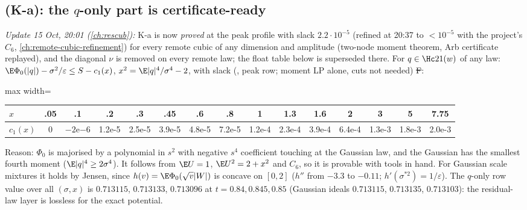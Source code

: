 \subsection{(K-a): the $q$-only part is certificate-ready}\label{sec:Ka}
\emph{Update 15 Oct, 20:01 (\autoref{ch:rescub}):} K-a is now \emph{proved} at the peak profile with slack $2.2\cdot10^{-5}$ (refined at 20:37 to $<10^{-5}$ with the project's $C_6$, \autoref{ch:remote-cubic-refinement}) for every remote cubic of any dimension and amplitude (two-node moment theorem, Arb certificate replayed), and the diagonal $\nu$ is removed on every remote law; the float table below is superseded there.
For $q\in\Hc21(w)$ of any law: $\E\Phi_0(|q|)-\sigma^2/\varepsilon\le S-c_1(x)$, $x^2=\E|q|^4/\sigma^4-2$, with slack (, peak row; moment LP alone,
cuts not needed) \st{F}:
\begin{center}\small
\begin{adjustbox}{max width=\linewidth}\begin{tabular}{lcccccccccccccc}\toprule
$x$ & .05 & .1 & .2 & .3 & .45 & .6 & .8 & 1 & 1.3 & 1.6 & 2 & 3 & 5 & 7.75\\\midrule
$c_1(x)$ & 0 & $-2$e$-6$ & 1.2e-5 & 2.5e-5 & 3.9e-5 & 4.8e-5 & 7.2e-5 & 1.2e-4 & 2.3e-4 & 3.9e-4 & 6.4e-4 & 1.3e-3 & 1.8e-3 & 2.0e-3\\\bottomrule
\end{tabular}\end{adjustbox}
\end{center}
Reason: $\Phi_0$ is majorised by a polynomial in $s^2$ with negative $s^4$ coefficient touching at the Gaussian law, and the Gaussian has the smallest
fourth moment ($\E|q|^4\ge2\sigma^4$). It follows from $\E U=1$, $\E U^2=2+x^2$ and $C_6$, so it is provable with tools in hand. For Gaussian scale mixtures it
holds by Jensen, since $h(v)=\E\Phi_0(\sqrt v|W|)$ is concave on $[0,2]$ ($h''$ from $-3.3$ to $-0.11$; $h'(\sigma^{*2})=1/\varepsilon$). The $q$-only row value over all
$(\sigma,x)$ is $0.713115$, $0.713133$, $0.713096$ at $t=0.84,0.845,0.85$ (Gaussian ideals $0.713115$, $0.713135$, $0.713103$): the residual-law layer is lossless for
the exact potential.

